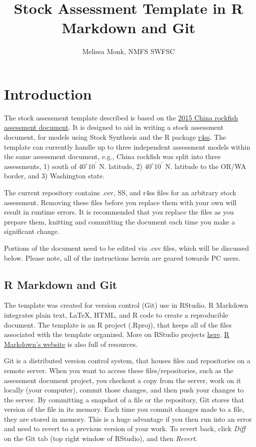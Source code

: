 \documentclass[12pt,]{article}
\title{Stock Assessment Template in R Markdown and Git}
\author{Melissa Monk, NMFS SWFSC}
\date{}
\begin{document}
\maketitle

{
\setcounter{tocdepth}{3}
\tableofcontents
}
\newpage

\section{Introduction}\label{introduction}

The stock assessment template described is based on the
\href{http://www.pcouncil.org/wp-content/uploads/2015/08/H3_Att3_China_FULLAssmt_E-Only_SEPT2015BB.pdf}{2015
China rockfish assessment document}. It is designed to aid in writing a
stock assessment document, for models using Stock Synthesis and the R
package \href{https://github.com/r4ss/r4ss}{r4ss}. The template can
currently handle up to three independent assessment models within the
same assessment document, e.g., China rockfish was split into three
assessments, 1) south of \(40^\circ 10^\prime\) N. latitude, 2)
\(40^\circ 10^\prime\) N. latitude to the OR/WA border, and 3)
Washington state.

The current repository contains .csv, SS, and r4ss files for an
arbitrary stock assessment. Removing these files before you replace them
with your own will result in runtime errors. It is recommended that you
replace the files as you prepare them, knitting and committing the
document each time you make a significant change.

Portions of the document need to be edited via .csv files, which will be
discussed below. Please note, all of the instructions herein are geared
towards PC users.

\subsection{R Markdown and Git}\label{r-markdown-and-git}

The template was created for version control (Git) use in RStudio. R
Markdown integrates plain text, LaTeX, HTML, and R code to create a
reproducible document. The template is an R project (.Rproj), that keeps
all of the files associated with the template organized. More on RStudio
projects
\href{https://support.rstudio.com/hc/en-us/articles/200526207-Using-Projects}{here}.
\href{http://rmarkdown.rstudio.com/}{R Markdown's website} is also full
of resources.

Git is a distributed version control system, that houses files and
repositories on a remote server. When you want to access these
files/repositories, such as the assessment document project, you
checkout a copy from the server, work on it locally (your computer),
commit those changes, and then push your changes to the server. By
committing a snapshot of a file or the repository, Git stores that
version of the file in its memory. Each time you commit changes made to
a file, they are stored in memory. This is a huge advantage if you then
run into an error and need to revert to a previous version of your work.
To revert back, click \emph{Diff} on the Git tab (top right window of
RStudio), and then \emph{Revert}.
\end{document}
